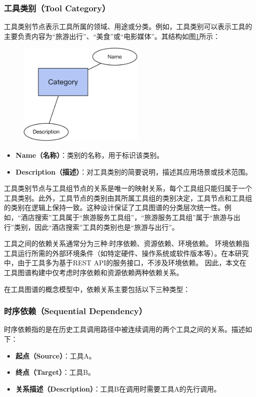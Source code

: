 \subsubsection{工具类别（Tool Category）}
工具类别节点表示工具所属的领域、用途或分类。例如，工具类别可以表示工具的主要负责内容为“旅游出行”、“美食”或“电影媒体”。其结构如图\ref{fig:ch3-kg-category}所示：

\begin{figure}[!htp]
    \vspace{1em}
    \centering
    \setlength{\abovecaptionskip}{10pt} %
    \includegraphics[height=5cm]{../assets/图谱格式-category.pdf}
    \label{fig:ch3-kg-category}
  \end{figure}

\begin{itemize}
    \item \textbf{Name（名称）}：类别的名称，用于标识该类别。
    \item \textbf{Description（描述）}：对工具类别的简要说明，描述其应用场景或技术范围。
\end{itemize}

工具类别节点与工具组节点的关系是唯一的映射关系，每个工具组只能归属于一个工具类别。此外，工具节点的类别由其所属工具组的类别决定，工具节点和工具组的类别在逻辑上保持一致。这种设计保证了工具图谱的分类层次统一性。例如，“酒店搜索”工具属于“旅游服务工具组”，“旅游服务工具组”属于“旅游与出行”类别，因此“酒店搜索”工具的类别也是“旅游与出行”。


工具之间的依赖关系通常分为三种\cite{shen2023taskbench}:时序依赖、资源依赖、环境依赖。
环境依赖指工具运行所需的外部环境条件（如特定硬件、操作系统或软件版本等）。在本研究中，由于工具多为基于REST API的服务接口，不涉及环境依赖。
因此，本文在工具图谱构建中仅考虑时序依赖和资源依赖两种依赖关系。

在工具图谱的概念模型中，依赖关系主要包括以下三种类型：

\subsubsection{时序依赖（Sequential Dependency）}
时序依赖指的是在历史工具调用路径中被连续调用的两个工具之间的关系。描述如下：
\begin{itemize}
    \item \textbf{起点（Source）}：工具A。
    \item \textbf{终点（Target）}：工具B。
    \item \textbf{关系描述（Description）}：工具B在调用时需要工具A的先行调用。
\end{itemize}

